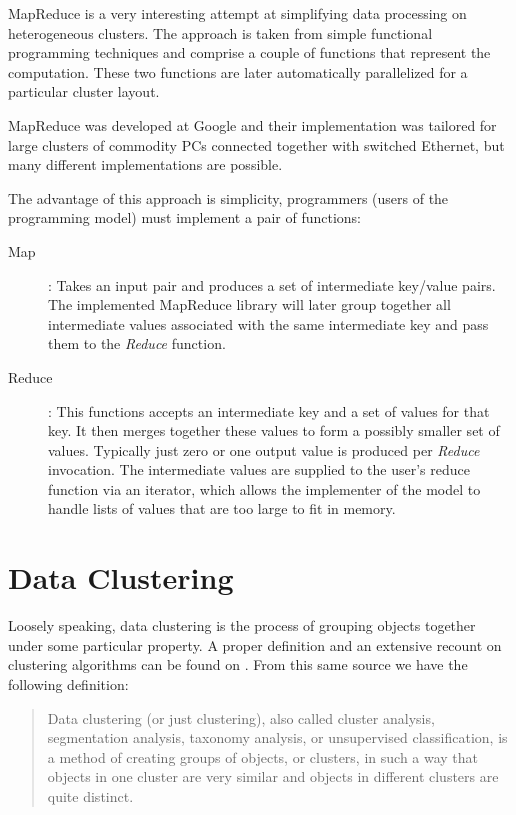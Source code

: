 \documentclass[a4paper,12pt,english]{report}
\begin{document}
MapReduce\cite{mapreduce} is a very interesting attempt at simplifying data processing on heterogeneous clusters. The approach is taken from simple functional programming techniques and comprise a couple of functions that represent the computation. These two functions are later automatically parallelized for a particular cluster layout.

MapReduce was developed at Google and their implementation was tailored for large clusters of commodity PCs connected together with switched Ethernet, but many different implementations are possible.

The advantage of this approach is simplicity, programmers (users of the programming model) must implement a pair of functions:
\begin{description}
\item [Map]: Takes an input pair and produces a set of intermediate key/value pairs. The implemented MapReduce library will later group together all intermediate values associated with the same intermediate key and pass them to the \emph{Reduce} function.
\item [Reduce]: This functions accepts an intermediate key and a set of values for that key. It then merges together these values to form a possibly smaller set of values. Typically just zero or one output value is produced per \emph{Reduce} invocation. The intermediate values are supplied to the user's reduce function via an iterator, which allows the implementer of the model to handle lists of values that are too large to fit in memory.
\end{description}


\section{Data Clustering}\label{dataclustering}

Loosely speaking, data clustering is the process of grouping objects together under some particular property. A proper definition and an extensive recount on clustering algorithms can be found on \cite{clustering}. From this same source we have the following definition:

\begin{quote}
Data clustering (or just clustering), also called cluster analysis, segmentation analysis, taxonomy analysis, or unsupervised classification, is a method of creating groups of objects, or clusters, in such a way that objects in one cluster are very similar and objects in different clusters are quite distinct.
\end{quote}
\end{document}
